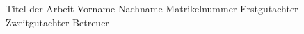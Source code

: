 \iRMBMaster
{Titel der Arbeit}            
{Vorname Nachname}
{Matrikelnummer}
{Erstgutachter}
{Zweitgutachter}
{Betreuer}
